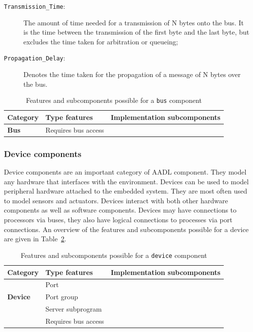 \begin{description}
\item[\texttt{Transmission\_Time}:]{The amount of time needed for a
  transmission of N bytes onto the bus. It is the time between the
  transmission of the first byte and the last byte, but excludes the
  time taken for arbitration or queueing;}
\item[\texttt{Propagation\_Delay}:]{Denotes the time taken for the
  propagation of a message of N bytes over the bus.}
\end{description}

\begin{table}
\centering
\begin{tabular}{|l|l|l|}
\hline
\textbf{Category} & \textbf{Type features} & \textbf{Implementation
  subcomponents} \\
\hline
\textbf{Bus} & Requires bus access & \\
\hline
\end{tabular}
\caption{Features and subcomponents possible for a \texttt{bus}
  component}
\label{tab:bus_rules}
\end{table}

\subsubsection{Device components}
Device components are an important category of AADL component. They
model any hardware that interfaces with the environment. Devices can
be used to model peripheral hardware attached to the embedded
system. They are most often used to model sensors and
actuators. Devices interact with both other hardware components as
well as software components. Devices may have connections to
processors via buses, they also have logical connections to processes
via port connections. An overview of the features and subcomponents
possible for a device are given in Table~\ref{tab:dev_rules}.

\begin{table}
\centering
\begin{tabular}{|l|l|l|}
\hline
\textbf{Category} & \textbf{Type features} & \textbf{Implementation
  subcomponents} \\
\hline
 & Port & \\
\textbf{Device} & Port group & \\
 & Server subprogram & \\
 & Requires bus access & \\
\hline
\end{tabular}
\caption{Features and subcomponents possible for a \texttt{device}
  component}
\label{tab:dev_rules}
\end{table}


